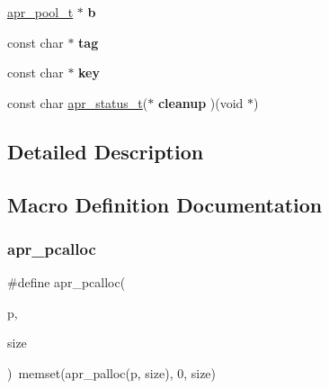 \begin{DoxyCompactItemize}
\mbox{\hyperlink{group__apr__pools_gaf137f28edcf9a086cd6bc36c20d7cdfb}{apr\+\_\+pool\+\_\+t}} $\ast$ {\bfseries b}
\item 
\mbox{\label{group__apr__pools_ga6c2820336727d93574a5e6cce8180fa2}} 
const char $\ast$ {\bfseries tag}
\item 
\mbox{\label{group__apr__pools_gacd3d88da3c0e0313c3645ff34f62f542}} 
const char $\ast$ {\bfseries key}
\item 
\mbox{\label{group__apr__pools_ga866ae63484f0c40378c84ac476f762e0}} 
const char \mbox{\hyperlink{group__apr__errno_gaf76ee4543247e9fb3f3546203e590a6c}{apr\+\_\+status\+\_\+t}}($\ast$ {\bfseries cleanup} )(void $\ast$)
\end{DoxyCompactItemize}


\subsection{Detailed Description}


\subsection{Macro Definition Documentation}
\mbox{\label{group__apr__pools_gad214fc0160de3c22b6435e29ea20fce8}} 
\subsubsection{\texorpdfstring{apr\+\_\+pcalloc}{apr\_pcalloc}}
{\footnotesize\ttfamily \#define apr\+\_\+pcalloc(\begin{DoxyParamCaption}\item[{}]{p,  }\item[{}]{size }\end{DoxyParamCaption})~memset(apr\+\_\+palloc(p, size), 0, size)}

